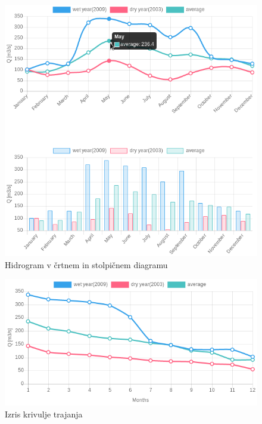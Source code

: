 \begin{figure}[htp!]
	\begin{centering}
		\includegraphics[width=\textwidth]{slike/opis/hidrogram.png}\caption{Hidrogram v črtnem in stolpičnem diagramu}\label{fig:opis_hidrogram}
	\end{centering}
\end{figure}


\begin{figure}[htp!]
	\begin{centering}
		\includegraphics[width=\textwidth]{slike/opis/krivuljaTrajanja.png}\caption{Izris krivulje trajanja}\label{fig:opis_krivuljaTrajanja}
	\end{centering}
\end{figure}




